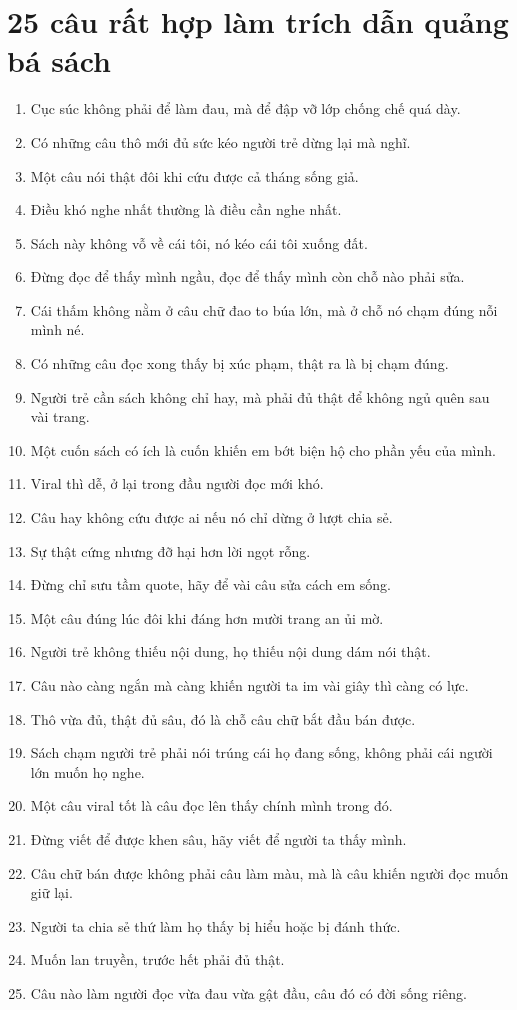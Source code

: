 \section{25 câu rất hợp làm trích dẫn quảng bá sách}
\begin{enumerate}[leftmargin=*,resume]
\item Cục súc không phải để làm đau, mà để đập vỡ lớp chống chế quá dày.
\item Có những câu thô mới đủ sức kéo người trẻ dừng lại mà nghĩ.
\item Một câu nói thật đôi khi cứu được cả tháng sống giả.
\item Điều khó nghe nhất thường là điều cần nghe nhất.
\item Sách này không vỗ về cái tôi, nó kéo cái tôi xuống đất.
\item Đừng đọc để thấy mình ngầu, đọc để thấy mình còn chỗ nào phải sửa.
\item Cái thấm không nằm ở câu chữ đao to búa lớn, mà ở chỗ nó chạm đúng nỗi mình né.
\item Có những câu đọc xong thấy bị xúc phạm, thật ra là bị chạm đúng.
\item Người trẻ cần sách không chỉ hay, mà phải đủ thật để không ngủ quên sau vài trang.
\item Một cuốn sách có ích là cuốn khiến em bớt biện hộ cho phần yếu của mình.
\item Viral thì dễ, ở lại trong đầu người đọc mới khó.
\item Câu hay không cứu được ai nếu nó chỉ dừng ở lượt chia sẻ.
\item Sự thật cứng nhưng đỡ hại hơn lời ngọt rỗng.
\item Đừng chỉ sưu tầm quote, hãy để vài câu sửa cách em sống.
\item Một câu đúng lúc đôi khi đáng hơn mười trang an ủi mờ.
\item Người trẻ không thiếu nội dung, họ thiếu nội dung dám nói thật.
\item Câu nào càng ngắn mà càng khiến người ta im vài giây thì càng có lực.
\item Thô vừa đủ, thật đủ sâu, đó là chỗ câu chữ bắt đầu bán được.
\item Sách chạm người trẻ phải nói trúng cái họ đang sống, không phải cái người lớn muốn họ nghe.
\item Một câu viral tốt là câu đọc lên thấy chính mình trong đó.
\item Đừng viết để được khen sâu, hãy viết để người ta thấy mình.
\item Câu chữ bán được không phải câu làm màu, mà là câu khiến người đọc muốn giữ lại.
\item Người ta chia sẻ thứ làm họ thấy bị hiểu hoặc bị đánh thức.
\item Muốn lan truyền, trước hết phải đủ thật.
\item Câu nào làm người đọc vừa đau vừa gật đầu, câu đó có đời sống riêng.
\end{enumerate}
